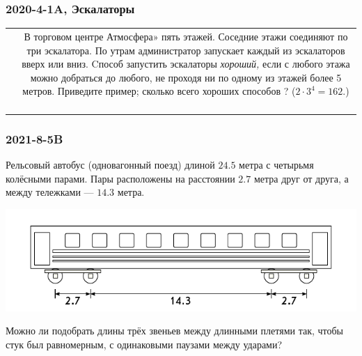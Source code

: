 \begin{frame} \frametitle{2020-4-1A, Эскалаторы}

\begin{center} \begin{tabular}{cc}
	\makecell[l]{} &
	\makecell[l]{
		В торговом центре Атмосфера» пять этажей. \\
		Соседние этажи соединяют по три эскалатора. \\
		По утрам администратор запускает каждый \\
		из эскалаторов вверх или вниз. Cпособ \\
		запустить эскалаторы {\it хороший,} если \\
		с любого этажа можно добраться до любого, \\
		не проходя ни по одному из этажей \\
		более 5 метров. Приведите пример; сколько всего \\
		хороших способов ? ($2 \cdot 3^4 = 162$.) \\ \ \\ \ \\}
\end{tabular} \end{center} \end{frame}

\begin{frame} \frametitle{2021-8-5B}
	Рельсовый автобус (одновагонный поезд) длиной $24.5$ метра с четырьмя колёсными парами. Пары расположены на расстоянии $2.7$ метра друг от друга, а между тележками — $14.3$ метра. \begin{center}\includegraphics{img/pbvagon}\end{center}

	Можно ли подобрать длины трёх звеньев между длинными плетями так, чтобы стук был равномерным, с одинаковыми паузами между ударами?
\end{frame}
